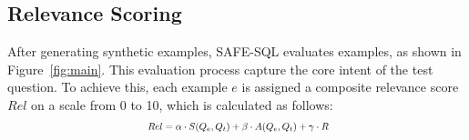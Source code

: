 \subsection{Relevance Scoring}
\begin{comment}
Following example generation, SAFE-SQL prioritizes the selection of highly pertinent examples to inform the final inference stage.This relevance evaluation strategy aligns with established principles in query understanding and information retrieval, aiming to favor examples that accurately capture the core intent of the request while minimizing irrelevant details~\cite{trust_sql} in text-to-SQL. To quantify relevance, each example is assigned a relevance score \( Rel \) on a scale from 0 to 10. The score leveraging three factors: reasoning path, the example question, and the corresponding SQL query. Formally, the relevance score \( R(e) \) for an example \( e \) is defined as:
\[
Rel =  S_q(e, Q_t) + S_k(e, Q_t) + S_r(e, Q_t) 
\]
where:
\begin{itemize}
    \item \( S_q(e, Q_t) \): Embedding similarity between the example question and \( Q_t \).
    \item \( S_k(e, Q_t) \): Key word \& Structural similarity of the SQL question associated with \( e \) to the expected schema context derived from \( Q_t \).
    \item \( S_r(e, Q_t) \): Completeness and Reasonability of the reasoning path of the example \( e \) to the test question \( Q_t \).
\end{itemize}
Each similarity component \( S \) is calculated using a combination of Reasonalbility, embedding-based similarity measures (cosine similarity), and keyword \& structural comparisons. The relevance scdore is composed of three parts: embedding similarity (max 3 points), keyword \& structural similarity (max 3 points), and the completeness and reasonability of the reasoning path (max 4 points). The reasonability component is assigned an additional point to include several sub-factors:  Logical Consistency, Schema Relevance of Reasoning Steps, Completeness of Reasoning, and Faithfulness to Question, each of which contributes to a more comprehensive evaluation of the reasoning path.
\end{comment}
After generating synthetic examples, SAFE-SQL evaluates examples, as shown in Figure~\ref{fig:main}. This evaluation process capture the core intent of the test question. To achieve this, each example \( e \) is assigned a composite relevance score \( Rel\) on a scale from 0 to 10, which is calculated as follows:
\begin{equation}\resizebox{0.42\textwidth}{!}{
$ Rel = \alpha \cdot S(Q_e, Q_t) + \beta \cdot A(Q_e, Q_t) + \gamma \cdot R$}
\end{equation}



